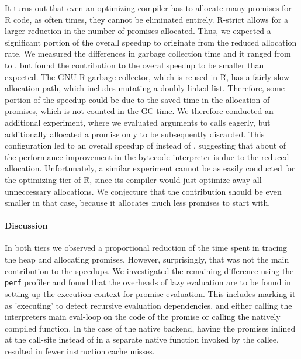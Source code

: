 \documentclass[review,nonacm,screen,acmsmall,anonymous=true]{acmart}
\renewcommand{\Rsh}{{\sf\u R}\xspace}
\newcommand{\Rshstrict}{{\sf\u R-strict}\xspace}
\begin{document}
It turns out that even an optimizing compiler has to allocate many promises for R
code, as often times, they cannot be eliminated entirely. \Rshstrict allows for
a larger reduction in the number of promises allocated.
Thus, we expected a significant portion of the overall speedup to originate from
the reduced allocation rate. We measured the differences in garbage collection
time and it ranged from \speedupGCRshStrictMin to \speedupGCRshStrictMax, but
found the contribution to the overal speedup to be smaller than expected.
The GNU R garbage collector, which is reused in \Rsh, has a fairly slow allocation path, which
includes mutating a doubly-linked list. Therefore, some portion of the speedup
could be due to the saved time in the allocation of promises, which is not counted in the GC time.
We therefore conducted an additional experiment, where we evaluated arguments to
calls eagerly, but additionally allocated a promise only to be subsequently discarded.
This configuration led to an overall speedup of
\speedupBCRshStrictAlloc instead of \speedupBCRshStrict, suggesting that
about \speedupDueToReducedGC of the performance improvement in the bytecode interpreter is due to the
reduced allocation. Unfortunately, a similar experiment cannot be as easily conducted
for the optimizing tier of \Rsh, since its compiler would just optimize away all
unneccessary allocations. We conjecture that the contribution should be even
smaller in that case, because it allocates much less promises to start with.

\paragraph{Discussion}

In both tiers we observed a proportional reduction of the time spent in tracing
the heap and allocating promises.
However, surprisingly, that was not the main contribution to the speedups.
We investigated the remaining difference using the \lstinline{perf} profiler
and found that the overheads of lazy evaluation are to be found in setting up the
execution context for promise evaluation. This includes marking it as 'executing'
to detect recursive evaluation dependencies, and either calling the interpreters
main eval-loop on the code of the promise or calling the natively compiled
function. In the case of the native backend, having the promises inlined at the
call-site instead of in a separate native function invoked by the callee,
resulted in fewer instruction cache misses.
\end{document}
